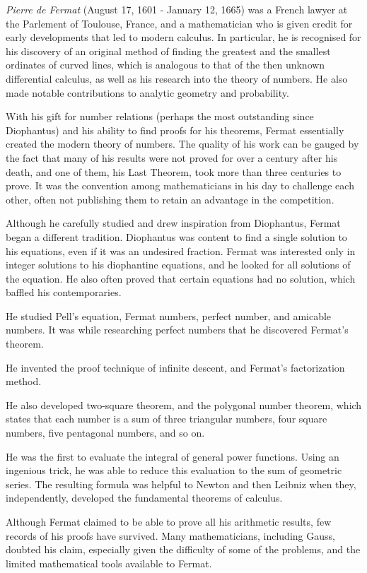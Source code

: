 \documentclass[12pt]{article}
\begin{document}
{\em Pierre de Fermat} (August 17, 1601 - January 12, 1665) was a French lawyer at the Parlement of Toulouse, France, and a mathematician who is given credit for early developments that led to modern calculus. In particular, he is recognised for his discovery of an original method of finding the greatest and the smallest ordinates of curved lines, which is analogous to that of the then unknown differential calculus, as well as his research into the theory of numbers. He also made notable contributions to analytic geometry and probability.

With his gift for number relations (perhaps the most outstanding since Diophantus) and his ability to find proofs for his theorems, Fermat essentially created the modern theory of numbers. The quality of his work can be gauged by the fact that many of his results were not proved for over a century after his death, and one of them, his Last Theorem, took more than three centuries to prove. It was the convention among mathematicians in his day to challenge each other, often not publishing them to retain an advantage in the competition.

Although he carefully studied and drew inspiration from Diophantus, Fermat began a different tradition. Diophantus was content to find a single solution to his equations, even if it was an undesired fraction. Fermat was interested only in integer solutions to his diophantine equations, and he looked for all solutions of the equation. He also often proved that certain equations had no solution, which baffled his contemporaries.

He studied Pell's equation, Fermat numbers, perfect number, and amicable numbers. It was while researching perfect numbers that he discovered Fermat's theorem.

He invented the proof technique of infinite descent, and Fermat's factorization method.

He also developed two-square theorem, and the polygonal number theorem, which states that each number is a sum of three triangular numbers, four square numbers, five pentagonal numbers, and so on.

He was the first to evaluate the integral of general power functions. Using an ingenious trick, he was able to reduce this evaluation to the sum of geometric series. The resulting formula was helpful to Newton and then Leibniz when they, independently, developed the fundamental theorems of calculus.

Although Fermat claimed to be able to prove all his arithmetic results, few records of his proofs have survived. Many mathematicians, including Gauss, doubted his claim, especially given the difficulty of some of the problems, and the limited mathematical tools available to Fermat.
\end{document}
